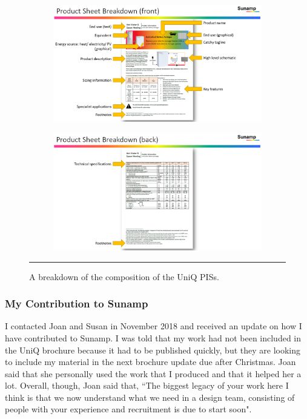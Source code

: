 \begin{figure}[htbp]
	\centering
	\begin{subfigure}{\textwidth}
		\centering
		\includegraphics[width=\textwidth]{figures/PIS_breakdown_01.PNG}
		\label{breakdown01}
	\end{subfigure}
	\begin{subfigure}{\textwidth}
		\centering
		\includegraphics[width=\textwidth]{figures/PIS_breakdown_02.PNG}
		\label{breakdown02}
	\end{subfigure}
	\rule{\textwidth}{0.5pt} %
	\caption{A breakdown of the composition of the UniQ PISs.}
	\label{breakdown}
\end{figure}




\subsubsection{My Contribution to Sunamp}

I contacted Joan and Susan in November 2018 and received an update on how I have contributed to Sunamp.
I was told that my work had not been included in the UniQ brochure because it had to be published quickly, but they are looking to include my material in the next brochure update due after Christmas.
Joan said that she personally used the work that I produced and that it helped her a lot.
Overall, though, Joan said that, ``The biggest legacy of your work here I think is that we now understand what we need in a design team, consisting of people with your experience and recruitment is due to start soon".


